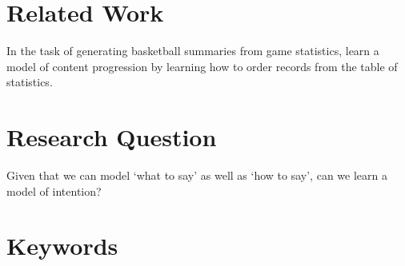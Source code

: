 \documentclass{article}
\begin{document}
\section{Related Work}
In the task of generating basketball summaries from game statistics,
\citet{puduppully2018contentselection} learn a model of content progression
by learning how to order records from the table of statistics.
\citep{puduppully2018contentselection,wiseman2018template}
\section{Research Question}
Given that we can model `what to say' as well as `how to say',
can we learn a model of intention?
\section{Keywords}
\end{document}
